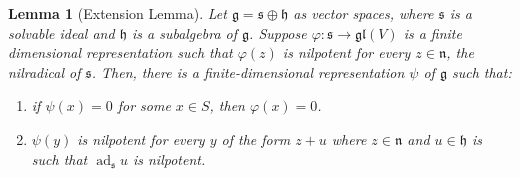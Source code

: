 \documentclass[12pt]{article}
\theoremstyle{thmstyle}
\newtheorem{lemma}[theorem]{Lemma}
\theoremstyle{defstyle}
\newcommand{\frakg}{\mathfrak{g}}
\newcommand{\frakh}{\mathfrak{h}}
\newcommand{\frakn}{\mathfrak{n}} %
\newcommand{\fraks}{\mathfrak{s}}
\newcommand{\gl}{\mathfrak{gl}}
\newcommand{\ad}{\operatorname{ad}}
\begin{document}
\begin{lemma}[Extension Lemma]
    Let $\frakg = \fraks\oplus\frakh$ as vector spaces, where $\fraks$ is a solvable ideal and $\frakh$ is a subalgebra of $\frakg$. Suppose $\varphi:\fraks\to\gl(V)$ is a finite dimensional representation such that $\varphi(z)$ is nilpotent for every $z\in\frakn$, the nilradical of $\fraks$. Then, there is a finite-dimensional representation $\psi$ of $\frakg$ such that: 
    \begin{enumerate}[label=(\alph*)]
        \item if $\psi(x) = 0$ for some $x\in S$, then $\varphi(x) = 0$.
        \item $\psi(y)$ is nilpotent for every $y$ of the form $z + u$ where $z\in\frakn$ and $u\in\frakh$ is such that $\ad_\fraks u$ is nilpotent.
    \end{enumerate}
\end{lemma}
\end{document}
